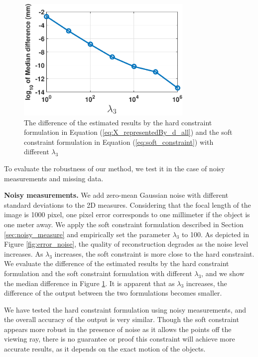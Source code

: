 \begin{figure}
\centering
\includegraphics[width=0.75\textwidth]{chapter5/resource/different_lambda.pdf}
\caption{The difference of the estimated results by the hard constraint formulation in Equation (\ref{eq:X_representedBy_d_all}) and the soft constraint formulation in Equation (\ref{eq:soft_constraint}) with different $\lambda_3$} 
\label{fig:soft_hard_diff}
\end{figure}

To evaluate the robustness of our method, we test it in the case of noisy measurements and missing data.

\textbf{Noisy measurements.} We add zero-mean Gaussian noise with different standard deviations to the 2D measures. Considering that the focal length of the image is 1000 pixel, one pixel error corresponds to one millimeter if the object is one meter away.
We apply the soft constraint formulation described in Section \ref{sec:noisy_measure} and empirically set the parameter $\lambda_3$ to 100. As depicted in Figure \ref{fig:error_noise}, the quality of reconstruction degrades as the noise level increases. As $\lambda_3$ increases, the soft constraint is more close to the hard constraint. %
We evaluate the difference of the estimated results by the hard constraint formulation and the soft constraint formulation with different $\lambda_3$, and we show the median difference in Figure \ref{fig:soft_hard_diff}. It is apparent that as $\lambda_3$ increases, the difference of the output between the two formulations becomes smaller.

We have tested the hard constraint formulation using noisy measurements, and the overall accuracy of the output is very similar. Though the soft constraint appears more robust in the presence of noise as it allows the points off the viewing ray, there is no guarantee or proof this constraint will achieve more accurate results, as it depends on the exact motion of the objects.


